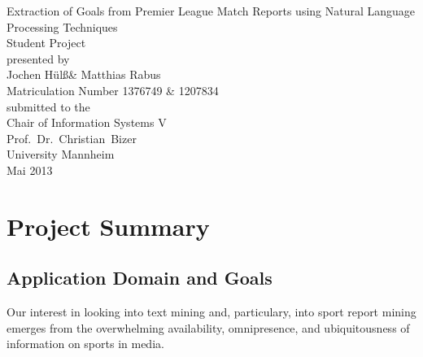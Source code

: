 \documentclass[11pt,titlepage,oneside,openany]{book}
\begin{document}
\begin{titlepage}
	\vspace*{2cm}
  \begin{center}
   {\Large Extraction of Goals from Premier League Match Reports using Natural Language Processing Techniques\\}
   \vspace{2cm} 
   {Student  Project\\}
   \vspace{2cm}
   {presented by\\
    Jochen H\"{u}l\ss \xspace  \&  Matthias Rabus \\
    Matriculation Number 1376749 \& 1207834 \\
   }
   \vspace{1cm} 
   {submitted to the\\
    Chair of Information Systems V\\
    Prof.\ Dr.\ Christian\ Bizer\\
    University Mannheim\\} \vspace{2cm}
   {Mai 2013}
  \end{center}
\end{titlepage} 

\tableofcontents
\newpage





\newpage



\chapter{Project Summary}
\section{Application Domain and Goals}
Our interest in looking into text mining and, particulary, into sport report mining emerges from the overwhelming availability, omnipresence, and ubiquitousness of information on sports in media. 
\end{document}
